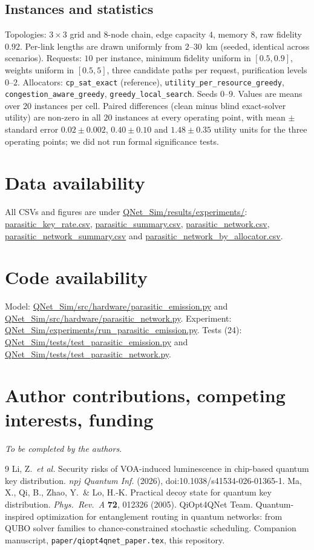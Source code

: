 \documentclass[10pt]{article}
\begin{document}
\subsection*{Instances and statistics}
Topologies: $3\times3$ grid and 8-node chain, edge capacity $4$, memory $8$,
raw fidelity $0.92$. Per-link lengths are drawn uniformly from $2$--$30$~km
(seeded, identical across scenarios). Requests: $10$ per instance, minimum
fidelity uniform in $[0.5,0.9]$, weights uniform in $[0.5,5]$, three candidate
paths per request, purification levels $0$--$2$. Allocators:
\texttt{cp\_sat\_exact} (reference), \texttt{utility\_per\_resource\_greedy},
\texttt{congestion\_aware\_greedy}, \texttt{greedy\_local\_search}. Seeds
$0$--$9$. Values are means over 20 instances per cell. Paired differences
(clean minus blind exact-solver utility) are non-zero in all $20$ instances at
every operating point, with mean $\pm$ standard error $0.02\pm0.002$,
$0.40\pm0.10$ and $1.48\pm0.35$ utility units for the three operating points; we
did not run formal significance tests.

\section*{Data availability}
All CSVs and figures are under \url{QNet_Sim/results/experiments/}:
\url{parasitic_key_rate.csv}, \url{parasitic_summary.csv},
\url{parasitic_network.csv}, \url{parasitic_network_summary.csv} and
\url{parasitic_network_by_allocator.csv}.

\section*{Code availability}
Model: \url{QNet_Sim/src/hardware/parasitic_emission.py} and
\url{QNet_Sim/src/hardware/parasitic_network.py}. Experiment:
\url{QNet_Sim/experiments/run_parasitic_emission.py}. Tests (24):
\url{QNet_Sim/tests/test_parasitic_emission.py} and
\url{QNet_Sim/tests/test_parasitic_network.py}.

\section*{Author contributions, competing interests, funding}
\emph{To be completed by the authors.}

\begin{thebibliography}{9}
 Li, Z.\ \emph{et al.} Security risks of VOA-induced
luminescence in chip-based quantum key distribution. \emph{npj Quantum Inf.}
(2026), doi:10.1038/s41534-026-01365-1.
 Ma, X., Qi, B., Zhao, Y.\ \& Lo, H.-K. Practical decoy
state for quantum key distribution. \emph{Phys.\ Rev.\ A} \textbf{72}, 012326
(2005).
 QiOpt4QNet Team. Quantum-inspired optimization for
entanglement routing in quantum networks: from QUBO solver families to
chance-constrained stochastic scheduling. Companion manuscript,
\texttt{paper/qiopt4qnet\_paper.tex}, this repository.
\end{thebibliography}
\end{document}
